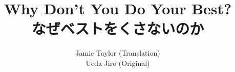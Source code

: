 \documentclass[11pt, a4paper, twoside]{report}
\begin{document}
\begin{CJK}{UTF8}{min}

\title{Why Don't You Do Your Best?\\なぜベストをくさないのか}
\author{Jamie Taylor (Translation)\\ Ueda Jiro (Original)}
\maketitle




\tableofcontents



\end{CJK}
\end{document}
